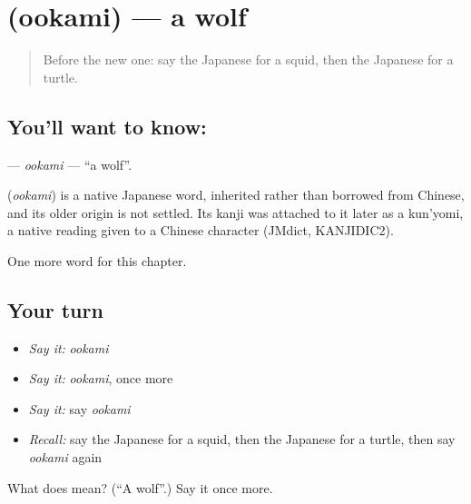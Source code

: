 \section[\texorpdfstring{\ja{おおかみ} (ookami)}{おおかみ (ookami)}]{ (ookami) — a wolf}

\label{lesson:JA-C47-ookami}



\begin{quote}
Before the new one: say the Japanese for a squid, then the Japanese for a turtle.
\end{quote}

\subsection*{You'll want to know: }
\textbf{} — \emph{ookami} — \textquotedblleft{}a wolf\textquotedblright{}.

\begin{cousinweb}
\textbf{} (\emph{ookami}) is a native Japanese word, inherited rather than borrowed from Chinese, and its older origin is not settled. Its kanji was attached to it later as a kun'yomi, a native reading given to a Chinese character (JMdict, KANJIDIC2).
\end{cousinweb}

\begin{grammarlens}[title={What you've built}]
One more word for this chapter.
\end{grammarlens}

\subsection*{Your turn}
\begin{itemize}
\raggedright
  \item \emph{Say it:} \emph{ookami}
  \item \emph{Say it:} \emph{ookami}, once more
  \item \emph{Say it:} say \emph{ookami}
  \item \emph{Recall:} say the Japanese for a squid, then the Japanese for a turtle, then say \emph{ookami} again
\end{itemize}

\begin{tcolorbox}[breakable,colback=teal!4,colframe=teal!35!black,title={Before you move on}]
What does  mean? (\textquotedblleft{}A wolf\textquotedblright{}.) Say it once more.
\end{tcolorbox}
